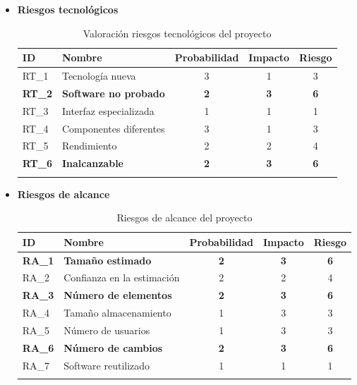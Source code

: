 \begin{enumerate}
\begin{itemize}
\item \textbf{Riesgos tecnológicos}
\begin{longtable}{l p{5cm} ccc}
\hline
\textbf{ID} & \textbf{Nombre} & \textbf{Probabilidad} & \textbf{Impacto} & \textbf{Riesgo} \\
\hline
\endhead
\endfoot
RT\_1 & 
Tecnología nueva &
3 &
1 &
3 
 \\
\textbf{RT\_2} & 
\textbf{Software no probado} &
\textbf{2} &
\textbf{3} &
\textbf{6} 
 \\
RT\_3 & 
Interfaz especializada &
1 &
1 &
1 
 \\
RT\_4 & 
Componentes diferentes &
3 &
1 &
3 
 \\
RT\_5 & 
Rendimiento &
2 &
2 &
4 
 \\
\textbf{RT\_6} & 
\textbf{Inalcanzable} &
\textbf{2} &
\textbf{3} &
\textbf{6} 
 \\
\hline
\caption{Valoración riesgos tecnológicos del proyecto}\label{ries_tecno_valoracion}\\
\end{longtable}

\item \textbf{Riesgos de alcance}
\begin{longtable}{l p{5cm} ccc}
\hline
\textbf{ID} & \textbf{Nombre} & \textbf{Probabilidad} & \textbf{Impacto} & \textbf{Riesgo} \\
\hline
\endhead
\endfoot
\textbf{RA\_1} & 
\textbf{Tamaño estimado} &
\textbf{2} &
\textbf{3} &
\textbf{6} 
 \\
RA\_2 & 
Confianza en la estimación &
2 &
2 &
4 
 \\
\textbf{RA\_3} & 
\textbf{Número de elementos} &
\textbf{2} &
\textbf{3} &
\textbf{6} 
 \\
RA\_4 & 
Tamaño almacenamiento &
1 &
3 &
3 
 \\
RA\_5 & 
Número de usuarios &
1 &
3 &
3 
 \\
\textbf{RA\_6} & 
\textbf{Número de cambios} &
\textbf{2} &
\textbf{3} &
\textbf{6} 
 \\
RA\_7 & 
Software reutilizado &
1 &
1 &
1 
 \\
\hline
\caption{Riesgos de alcance del proyecto}\label{ries_alcan}\\
\end{longtable}


\end{itemize}
\end{enumerate}
